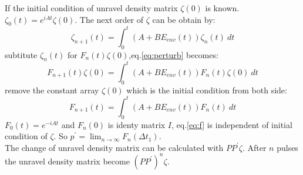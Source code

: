 \documentclass[11pt,a4paper]{article}
\begin{document}
If the initial condition of unravel density matrix $\zeta(0)$ is known. $\zeta_{0} (t) = e^{i A t} \zeta(0)$. The next order of $\zeta$ can be obtain by:
\begin{equation}
  \label{eq:perturb}
  \zeta_{n+1}(t) = \int_0^t \left( A+B E_{env}(t) \right) \zeta_n(t)\:dt
\end{equation}
subtitute $\zeta_n(t)$ for $F_n(t)\zeta(0)$,eq.\ref{eq:perturb} becomes:
\begin{equation}
  F_{n+1}(t)\zeta(0) = \int_0^t \left( A+B E_{env}(t) \right) F_n(t)\zeta(0)\:dt
\end{equation}
remove the constant array $\zeta(0)$ which is the initial condition from both side:
\begin{equation}
  \label{eq:f}
  F_{n+1}(t) = \int_0^t \left( A+B E_{env}(t) \right) F_n(t)\:dt
\end{equation}
$F_0(t) = e^{-iAt}$ and $F_{n}(0)$ is identy matrix $I$, eq.\ref{eq:f} is independent of initial condition of $\zeta$. So $p^{\prime} = \lim_{n\rightarrow \infty}F_{n}(\Delta t_{1})$.\\

The change of unravel density matrix can be calculated with $PP^{\prime}\zeta$. After $n$ pulses the unravel density matrix become $\left( PP^{\prime} \right)^{n}\zeta$.
%
\end{document}
